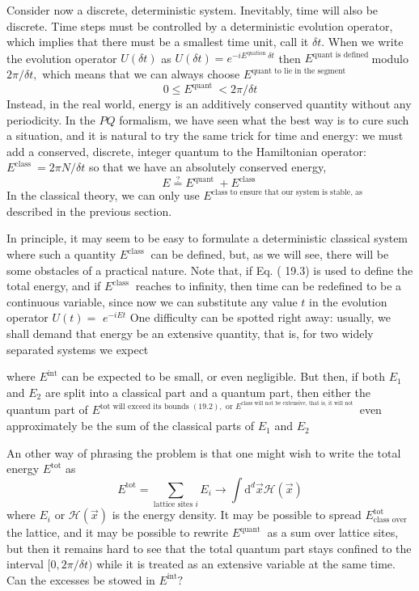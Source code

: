 \documentclass[main.tex]{subfiles}
\begin{document}
Consider now a discrete, deterministic system. Inevitably, time will also be discrete. Time steps must be controlled by a deterministic evolution operator, which implies that there must be a smallest time unit, call it $\delta t .$ When we write the evolution operator $U(\delta t)$ as $U(\delta t)=e^{-i E^{\text {quation }} \delta t}$ then $E^{\text {quant is defined }}$modulo $2 \pi / \delta t,$ which means that we can always choose $E^{\text {quant to lie in the segment }}$
$$
0 \leq E^{\text {quant }}<2 \pi / \delta t
$$
Instead, in the real world, energy is an additively conserved quantity without any periodicity. In the $P Q$ formalism, we have seen what the best way is to cure such a situation, and it is natural to try the same trick for time and energy: we must add a conserved, discrete, integer quantum to the Hamiltonian operator: $E^{\text {class }}=2 \pi N / \delta t$ so that we have an absolutely conserved energy,
$$
E \stackrel{?}{=} E^{\text {quant }}+E^{\text {class }}
$$
In the classical theory, we can only use $E^{\text {class to ensure that our system is stable, as }}$ described in the previous section.

In principle, it may seem to be easy to formulate a deterministic classical system where such a quantity $E^{\text {class }}$ can be defined, but, as we will see, there will be some obstacles of a practical nature. Note that, if Eq. ( 19.3) is used to define the total energy, and if $E^{\text {class }}$ reaches to infinity, then time can be redefined to be a continuous variable, since now we can substitute any value $t$ in the evolution operator $U(t)=$ $e^{-i E t}$
One difficulty can be spotted right away: usually, we shall demand that energy be an extensive quantity, that is, for two widely separated systems we expect

where $E^{\mathrm{int}}$ can be expected to be small, or even negligible. But then, if both $E_{1}$ and $E_{2}$ are split into a classical part and a quantum part, then either the quantum part of $E^{\text {tot will exceed its bounds }(19.2), \text { or } E^{\text {class will not be extensive, that is, it will not }}}$ even approximately be the sum of the classical parts of $E_{1}$ and $E_{2}$

An other way of phrasing the problem is that one might wish to write the total energy $E^{\mathrm{tot}}$ as
$$
E^{\mathrm{tot}}=\sum_{\text {lattice sites } i} E_{i} \rightarrow \int \mathrm{d}^{d} \vec{x} \mathcal{H}(\vec{x})
$$
where $E_{i}$ or $\mathcal{H}(\vec{x})$ is the energy density. It may be possible to spread $E_{\text {class over }}^{\text {tot }}$ the lattice, and it may be possible to rewrite $E^{\text {quant }}$ as a sum over lattice sites, but then it remains hard to see that the total quantum part stays confined to the interval
$[0,2 \pi / \delta t)$ while it is treated as an extensive variable at the same time. Can the excesses be stowed in $E^{\mathrm{int}} ?$
\end{document}
